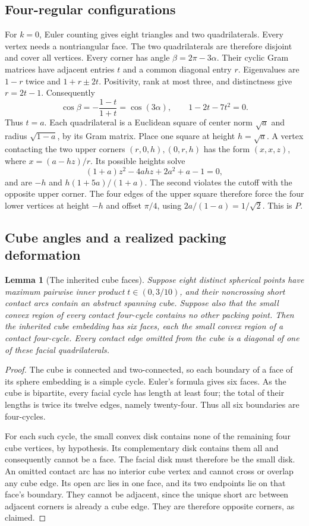 \documentclass[12pt,reqno]{amsart}
\newtheorem{lemma}[theorem]{Lemma}
\theoremstyle{definition}
\numberwithin{equation}{section}
\begin{document}
\subsection{Four-regular configurations}
For $k=0$, Euler counting gives eight triangles and two quadrilaterals.
Every vertex needs a nontriangular face. The two quadrilaterals are
therefore disjoint and cover all vertices. Every corner has angle
$\beta=2\pi-3\alpha$. Their cyclic Gram matrices have adjacent entries
$t$ and a common diagonal entry $r$. Eigenvalues are $1-r$ twice and
$1+r\pm2t$. Positivity, rank at most three, and distinctness give $r=2t-1$.
Consequently
\[
 \cos\beta=-\frac{1-t}{1+t}=\cos(3\alpha),\qquad
 1-2t-7t^2=0.
\]
Thus $t=a$. Each quadrilateral is a Euclidean square of center norm
$\sqrt a$ and radius $\sqrt{1-a}$, by its Gram matrix. Place one square
at height $h=\sqrt a$. A vertex contacting the two upper corners
$(r,0,h),(0,r,h)$ has the form $(x,x,z)$, where $x=(a-hz)/r$.
Its possible heights solve
\[
 (1+a)z^2-4ahz+2a^2+a-1=0,
\]
and are $-h$ and $h(1+5a)/(1+a)$. The second violates the cutoff with
the opposite upper corner. The four edges of the upper square therefore
force the four lower vertices at height $-h$ and offset $\pi/4$, using
$2a/(1-a)=1/\sqrt2$. This is $P$.

\subsection{Cube angles and a realized packing deformation}
\begin{lemma}[The inherited cube faces]\label{r3:topology-cube-faces}
Suppose eight distinct spherical points have maximum pairwise inner
product $t\in(0,3/10)$, and their noncrossing short contact arcs
contain an abstract spanning cube. Suppose also that the small convex
region of every contact four-cycle contains no other packing point.
Then the inherited cube embedding has six faces, each the small convex
region of a contact four-cycle. Every contact edge omitted from the
cube is a diagonal of one of these facial quadrilaterals.
\end{lemma}
\begin{proof}
The cube is connected and two-connected, so each boundary of a face
of its sphere embedding is a simple cycle. Euler's formula gives six
faces. As the cube is bipartite, every facial cycle has length at
least four; the total of their lengths is twice its twelve edges,
namely twenty-four. Thus all six boundaries are four-cycles.

For each such cycle, the small convex disk contains none of the
remaining four cube vertices, by hypothesis. Its complementary disk
contains them all and consequently cannot be a face. The facial disk
must therefore be the small disk. An omitted contact arc has no
interior cube vertex and cannot cross or overlap any cube edge. Its
open arc lies in one face, and its two endpoints lie on that face's
boundary. They cannot be adjacent, since the unique short arc between
adjacent corners is already a cube edge. They are therefore opposite
corners, as claimed.
\end{proof}
\end{document}
